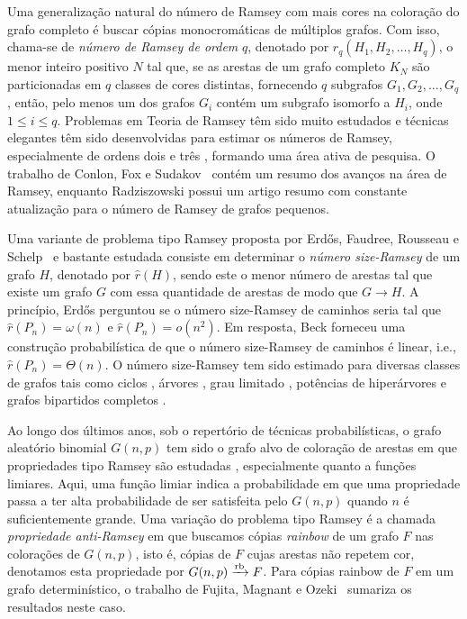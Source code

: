 \documentclass[12pt,a4paper]{book}
\def\rbarrow{\xrightarrow[]{\raisebox{0.0mm}[0mm]{$\scriptstyle \rm rb$}}}
\begin{document}
Uma generalização natural do número de Ramsey com mais cores na coloração do grafo completo é buscar cópias monocromáticas de múltiplos grafos.
Com isso, chama-se de \emph{número de Ramsey de ordem} $q$, denotado por $r_q(H_1,H_2, \ldots ,H_q)$,
 o menor inteiro positivo $N$ tal que, se as arestas de um grafo completo $K_N$ são particionadas em $q$ classes de cores distintas, fornecendo $q$ subgrafos $G_1, G_2, \ldots,G_q$, então,
pelo menos um dos grafos $G_i$ contém um subgrafo isomorfo a $H_i$, onde $1 \leq i \leq q$.
Problemas em Teoria de Ramsey têm sido muito estudados e técnicas elegantes têm sido desenvolvidas para estimar os números de Ramsey, especialmente de ordens dois \cite{pontiveros2016ramsey, montgomery2023ramsey} e três \cite{BeSk09, MoSaScTa13}, formando uma área ativa de pesquisa.
O trabalho de Conlon, Fox e Sudakov~\cite{CoFoSu15} contém um resumo dos avanços na área de Ramsey, enquanto Radziszowski \cite{radziszowski2011small} possui um artigo resumo com constante atualização para o número de Ramsey de grafos pequenos.

Uma variante de problema tipo Ramsey proposta por Erd\H{o}s, Faudree, Rousseau e Schelp~\cite{ErFaRoSc78} e bastante estudada consiste em determinar o \emph{número size-Ramsey} de um grafo $H$, denotado por $\hat{r}(H)$, sendo este o menor número de arestas tal que existe um grafo $G$ com essa quantidade de arestas de modo que $G \rightarrow H$. 
A princípio, Erd\H{o}s \cite{erdos81:_i} perguntou se o número size-Ramsey de caminhos seria tal que $\hat{r}(P_n) = \omega(n)$ e $\hat{r}(P_n) = o(n^2)$.
Em resposta, Beck \cite{Be83} forneceu uma construção probabilística de que o número size-Ramsey de caminhos é linear, i.e., $\hat{r}(P_n) = \Theta(n)$.  
O número size-Ramsey tem sido estimado para diversas classes de grafos tais como ciclos \cite{HaKo95}, árvores \cite{dellamonica12:_ramsey}, grau limitado \cite{rodl2000size}, potências de hiperárvores \cite{letzter2021size} e grafos bipartidos completos \cite{conlon2023three}. 

Ao longo dos últimos anos, sob o repertório de técnicas probabilísticas, o grafo aleatório binomial $G(n,p)$ tem sido o grafo alvo de coloração de arestas em que propriedades tipo Ramsey são estudadas \cite{rodl1993lower, rodl1995threshold}, especialmente quanto a funções limiares. 
Aqui, uma função limiar indica a probabilidade em que uma propriedade passa a ter alta probabilidade de ser satisfeita pelo $G(n,p)$ quando $n$ é suficientemente grande.
Uma variação do problema tipo Ramsey é a chamada \textit{propriedade anti-Ramsey} em que buscamos cópias \textit{rainbow} de um grafo $F$ nas colorações de $G(n,p)$, isto é, cópias de $F$ cujas arestas não repetem cor, denotamos esta propriedade por $G(n,p)\rbarrow F$.
Para cópias rainbow de $F$ em um grafo determinístico, o trabalho  de Fujita, Magnant e Ozeki~\cite{fujita2010rainbow} sumariza os resultados neste caso.
\end{document}
